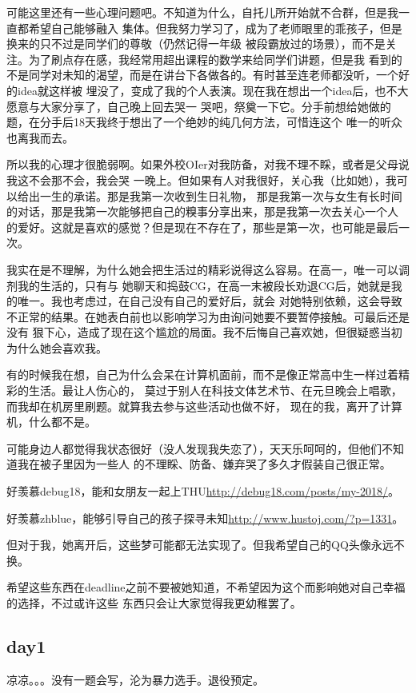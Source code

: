 可能这里还有一些心理问题吧。不知道为什么，自托儿所开始就不合群，但是我一直都希望自己能够融入
集体。但我努力学习了，成为了老师眼里的乖孩子，但是换来的只不过是同学们的尊敬（仍然记得一年级
被段霸放过的场景），而不是关注。为了刷点存在感，我经常用超出课程的数学来给同学们讲题，但是我
看到的不是同学对未知的渴望，而是在讲台下各做各的。有时甚至连老师都没听，一个好的idea就这样被
埋没了，变成了我的个人表演。现在我在想出一个idea后，也不大愿意与大家分享了，自己晚上回去哭一
哭吧，祭奠一下它。分手前想给她做的题，在分手后18天我终于想出了一个绝妙的纯几何方法，可惜连这个
唯一的听众也离我而去。

所以我的心理才很脆弱啊。如果外校OIer对我防备，对我不理不睬，或者是父母说我这不会那不会，我会哭
一晚上。但如果有人对我很好，关心我（比如她），我可以给出一生的承诺。那是我第一次收到生日礼物，
那是我第一次与女生有长时间的对话，那是我第一次能够把自己的糗事分享出来，那是我第一次去关心一个人
的爱好。这就是喜欢的感觉？但是现在不存在了，那些是第一次，也可能是最后一次。

我实在是不理解，为什么她会把生活过的精彩说得这么容易。在高一，唯一可以调剂我的生活的，只有与
她聊天和捣鼓CG，在高一末被段长劝退CG后，她就是我的唯一。我也考虑过，在自己没有自己的爱好后，就会
对她特别依赖，这会导致不正常的结果。在她表白前也以影响学习为由询问她要不要暂停接触。可最后还是没有
狠下心，造成了现在这个尴尬的局面。我不后悔自己喜欢她，但很疑惑当初为什么她会喜欢我。

有的时候我在想，自己为什么会呆在计算机面前，而不是像正常高中生一样过着精彩的生活。最让人伤心的，
莫过于别人在科技文体艺术节、在元旦晚会上唱歌，而我却在机房里刷题。就算我去参与这些活动也做不好，
现在的我，离开了计算机，什么都不是。

可能身边人都觉得我状态很好（没人发现我失恋了），天天乐呵呵的，但他们不知道我在被子里因为一些人
的不理睬、防备、嫌弃哭了多久才假装自己很正常。

好羡慕debug18，能和女朋友一起上THU\url{http://debug18.com/posts/my-2018/}。

好羡慕zhblue，能够引导自己的孩子探寻未知\url{http://www.hustoj.com/?p=1331}。

但对于我，她离开后，这些梦可能都无法实现了。但我希望自己的QQ头像永远不换。

希望这些东西在deadline之前不要被她知道，不希望因为这个而影响她对自己幸福的选择，不过或许这些
东西只会让大家觉得我更幼稚罢了。

\subsection{day1}
凉凉。。。没有一题会写，沦为暴力选手。退役预定。

